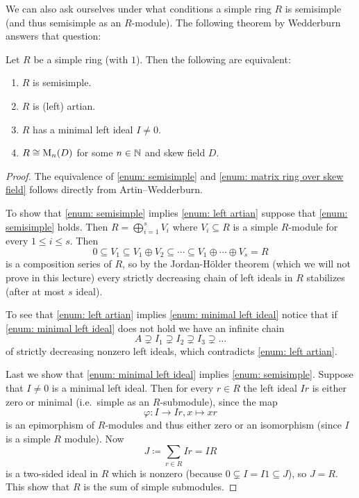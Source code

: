 We can also ask ourselves under what conditions a simple ring $R$ is semisimple (and thus semisimple as an $R$-module). The following theorem by Wedderburn answers that question:


\begin{thrm}[Wedderburn]
 Let $R$ be a simple ring (with $1$). Then the following are equivalent:
 \begin{enumerate}[label=\emph{\roman*)},leftmargin=*]
  \item \label{enum: semisimple}
   $R$ is semisimple.
  \item \label{enum: left artian}
   $R$ is (left) artian.
  \item \label{enum: minimal left ideal}
   $R$ has a minimal left ideal $I \neq 0$.
  \item \label{enum: matrix ring over skew field}
   $R \cong \operatorname{M}_n(D)$ for some $n \in \mathbb{N}$ and skew field $D$.
 \end{enumerate}
\end{thrm}
\begin{proof}
 The equivalence of \ref{enum: semisimple} and \ref{enum: matrix ring over skew field} follows directly from Artin--Wedderburn.
 
 To show that \ref{enum: semisimple} implies \ref{enum: left artian} suppose that \ref{enum: semisimple} holds. Then $R = \bigoplus_{i=1}^s V_i$ where $V_i \subseteq R$ is a simple $R$-module for every $1 \leq i \leq s$. Then
 \[
  0 \subseteq V_1 \subseteq V_1 \oplus V_2 \subseteq \dotsb \subseteq V_1 \oplus \dotsb \oplus V_s = R
 \]
 is a composition series of $R$, so by the Jordan-Hölder theorem (which we will not prove in this lecture) every strictly decreasing chain of left ideals in $R$ stabilizes (after at most $s$ ideal).
 
 To see that \ref{enum: left artian} implies \ref{enum: minimal left ideal} notice that if \ref{enum: minimal left ideal} does not hold we have an infinite chain
 \[
  A \supsetneq I_1 \supsetneq I_2 \supsetneq I_3 \supsetneq \dotso
 \]
 of strictly decreasing nonzero left ideals, which contradicts \ref{enum: left artian}.
 
 Last we show that \ref{enum: minimal left ideal} implies \ref{enum: semisimple}. Suppose that $I \neq 0$ is a minimal left ideal. Then for every $r \in R$ the left ideal $Ir$ is either zero or minimal (i.e.\ simple as an $R$-submodule), since the map
 \[
  \varphi \colon I \to Ir, x \mapsto xr
 \]
 is an epimorphism of $R$-modules and thus either zero or an isomorphism (since $I$ is a simple $R$ module). Now
 \[
  J \coloneqq \sum_{r \in R} Ir = IR
 \]
 is a two-sided ideal in $R$ which is nonzero (because $0 \subsetneq I = I1 \subseteq J$), so $J = R$. This show that $R$ is the sum of simple submodules.
\end{proof}


